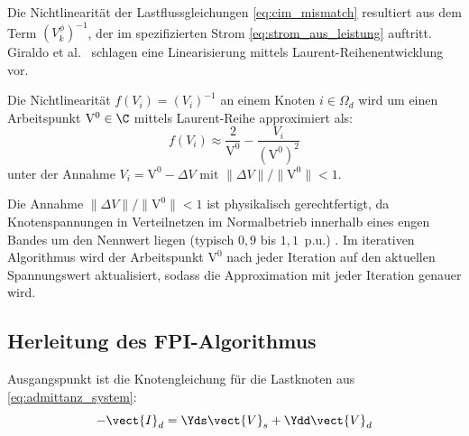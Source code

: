 Die Nichtlinearität der Lastflussgleichungen \eqref{eq:cim_mismatch} resultiert aus dem Term $(V_k^\phi)^{-1}$, der im spezifizierten Strom \eqref{eq:strom_aus_leistung} auftritt. Giraldo et al.\ \cite{Giraldo2022} schlagen eine Linearisierung mittels Laurent-Reihenentwicklung vor.

\begin{proposition}
	\label{prop:laurent}
	Die Nichtlinearität $f(V_i) = (V_i)^{-1}$ an einem Knoten $i \in \Omega_d$ wird um einen Arbeitspunkt $\mathrm{V}^0 \in \C$ mittels Laurent-Reihe approximiert als:
	\begin{equation}
		f(V_i) \approx \frac{2}{\mathrm{V}^0} - \frac{V_i}{(\mathrm{V}^0)^2}
		\label{eq:laurent_approx}
	\end{equation}
	unter der Annahme $V_i = \mathrm{V}^0 - \Delta V$ mit $\|\Delta V\| / \|\mathrm{V}^0\| < 1$.
\end{proposition}


Die Annahme $\|\Delta V\| / \|\mathrm{V}^0\| < 1$ ist physikalisch gerechtfertigt, da Knotenspannungen in Verteilnetzen im Normalbetrieb innerhalb eines engen Bandes um den Nennwert liegen (typisch $0{,}9$ bis $1{,}1$~p.u.) \cite{Giraldo2022}. Im iterativen Algorithmus wird der Arbeitspunkt $\mathrm{V}^0$ nach jeder Iteration auf den aktuellen Spannungswert aktualisiert, sodass die Approximation mit jeder Iteration genauer wird.

\subsection{Herleitung des FPI-Algorithmus}
\label{subsec:fpi_herleitung}

Ausgangspunkt ist die Knotengleichung für die Lastknoten aus \eqref{eq:admittanz_system}:
\begin{equation}
	-\vect{I}_d = \Yds \vect{V}_s + \Ydd \vect{V}_d
	\label{eq:kirchhoff_demand}
\end{equation}

